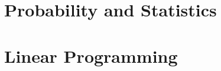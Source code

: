 \documentclass[8pt,twoside]{book}
\begin{document}
\part{Probability and Statistics}


\part{Linear Programming}


% 

% 

% 

\backmatter


\printbibliography[heading=bibintoc]
\printindex
\end{document}

